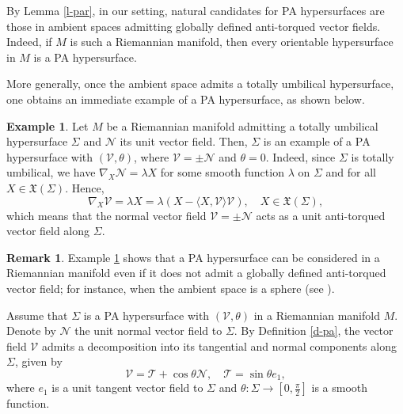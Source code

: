 \documentclass[12pt,reqno]{amsart}
\def\v{\mathcal V}
\def\n{\mathcal N}
\def\t{\mathcal T}
\def\x{\mathfrak X}
\theoremstyle{definition}
\newtheorem{example}[theorem]{Example}
\newtheorem{remark}[theorem]{Remark}
\begin{document}
By Lemma \ref{l-par}, in our setting, natural candidates for PA hypersurfaces are those in ambient spaces admitting globally defined anti-torqued vector fields. Indeed, if $M$ is such a Riemannian manifold, then every orientable hypersurface in $M$ is a PA hypersurface.

More generally, once the ambient space admits a totally umbilical hypersurface, one obtains an immediate example of a PA hypersurface, as shown below.

\begin{example}\label{ex31}
Let $M$ be a Riemannian manifold admitting a totally umbilical hypersurface $\Sigma$ and $\n$ its unit vector field. Then, $\Sigma$ is an example of a PA hypersurface with $(\v,\theta)$, where $\v=\pm\n$ and $\theta=0$. Indeed, since $\Sigma$ is totally umbilical, we have $\nabla_X \n = \lambda X$ for some smooth function $\lambda$ on $\Sigma$ and for all $X\in \mathfrak{X}(\Sigma)$. Hence,
$$\nabla_X\v=\lambda X=\lambda(X-\langle X,\v\rangle\v), \quad X\in \x(\Sigma),$$
which means that the normal vector field $\v=\pm\n$ acts as a unit anti-torqued vector field along $\Sigma$.
\end{example}

\begin{remark}\label{rem31}
Example \ref{ex31} shows that a PA hypersurface can be considered in a Riemannian manifold even if it does not admit a globally defined anti-torqued vector field; for instance, when the ambient space is a sphere (see \cite[Example 1]{dan}).
\end{remark}

Assume that $\Sigma$ is a PA hypersurface with $(\v,\theta)$ in a Riemannian manifold $M$. Denote by $\n$ the unit normal vector field to $\Sigma$. By Definition \ref{d-pa}, the vector field $\v$ admits a  decomposition into its tangential and normal components along $\Sigma$, given by
\begin{equation}\label{decomp}
\v=\t +\cos \theta \n, \quad  \t=\sin\theta e_1,
\end{equation}
where $e_1$ is a unit tangent vector field to $\Sigma$ and $\theta:\Sigma\to [0,\frac{\pi}{2}]$ is a smooth function. 
\end{document}
